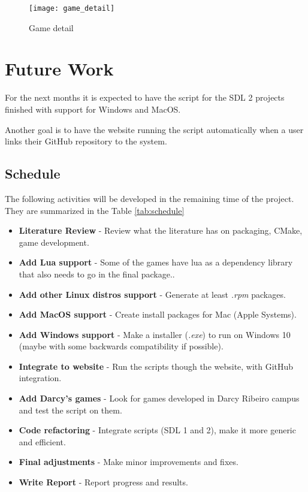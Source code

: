 \begin{figure}[h!]
\centering
\texttt{[image: game\_detail]}
\caption{Game detail}
\label{fig:game_detail}
\end{figure}

\section[Future Work]{Future Work}

For the next months it is expected to have the script for the SDL 2 projects finished with support for Windows and MacOS.

Another goal is to have the website running the script automatically when a user links their GitHub repository to the system.


\subsection[Schedule]{Schedule}

The following activities will be developed in the remaining time of the project. They are summarized in the Table \ref{tab:schedule}

\begin{itemize}
\item \textbf{Literature Review} - Review what the literature has on packaging, CMake, game development.
\item \textbf{Add Lua support} - Some of the games have lua as a dependency library that also needs to go in the final package..
\item \textbf{Add other Linux distros support} - Generate at least \textit{.rpm} packages.
\item \textbf{Add MacOS support} - Create install packages for Mac (Apple Systems).
\item \textbf{Add Windows support} - Make a installer (\textit{.exe}) to run on Windows 10 (maybe with some backwards compatibility if possible).
\item \textbf{Integrate to website} - Run the scripts though the website, with GitHub integration.
\item \textbf{Add Darcy's games} - Look for games developed in Darcy Ribeiro campus and test the script on them.
\item \textbf{Code refactoring} - Integrate scripts (SDL 1 and 2), make it more generic and efficient.
\item \textbf{Final adjustments} - Make minor improvements and fixes.
\item \textbf{Write Report} - Report progress and results.
\end{itemize}

